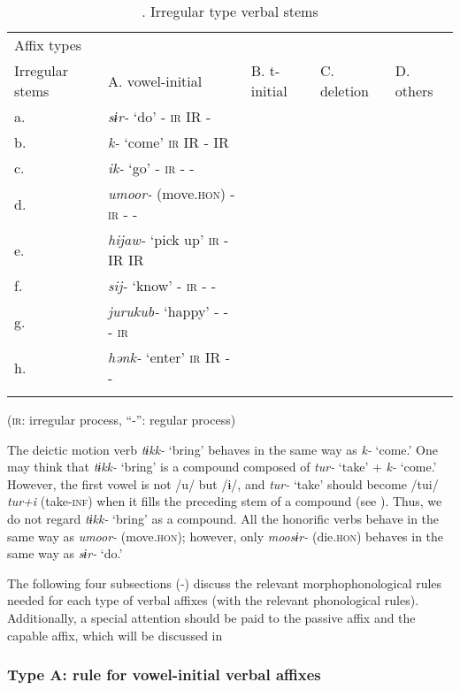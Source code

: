 \begin{table}
\caption{\label{tab:key:59}. Irregular type verbal stems}
\begin{tabular}{lllll}
\lsptoprule
    Affix types\\
Irregular stems &    A. vowel-initial&   B. t-initial &  C. deletion &  D. others\\
\midrule
a.&  \textit{sɨr-} ‘do’    -  \textsc{ir}  IR  -                     \\
b.&  \textit{k-} ‘come’    \textsc{ir}  IR  -  IR                    \\
c.&  \textit{ik-} ‘go’    -  \textsc{ir}  -  -                       \\
d.&  \textit{umoor-} (move.\textsc{hon})    -  \textsc{ir}  -  -     \\
e.&  \textit{hijaw-} ‘pick up’    \textsc{ir}  -  IR  IR             \\
f.&  \textit{sij-} ‘know’    -  \textsc{ir}  -  -                    \\
g.&  \textit{jurukub-} ‘happy’    -  -  -  \textsc{ir}               \\
h.&  \textit{hənk-} ‘enter’    \textsc{ir}  IR  -  -                 \\
\lspbottomrule
\end{tabular}
(\textsc{ir}: irregular process, “-”: regular process)
\end{table}

The deictic motion verb \textit{tɨkk-} ‘bring’ behaves in the same way as \textit{k-} ‘come.’ One may think that \textit{tɨkk-} ‘bring’ is a compound composed of \textit{tur-} ‘take’ + \textit{k-} ‘come.’ However, the first vowel is not /u/ but /ɨ/, and \textit{tur-} ‘take’ should become /tui/ \textit{tur+i} (take-\textsc{inf}) when it fills the preceding stem of a compound (see ). Thus, we do not regard \textit{tɨkk-} ‘bring’ as a compound. All the honorific verbs behave in the same way as \textit{umoor-} (move.\textsc{hon}); however, only \textit{moosɨr-} (die.\textsc{hon}) behaves in the same way as \textit{sɨr-} ‘do.’

The following four subsections (-) discuss the relevant morphophonological rules needed for each type of verbal affixes (with the relevant phonological rules). Additionally, a special attention should be paid to the passive affix and the capable affix, which will be discussed in 

\subsubsection{Type A: rule for vowel-initial verbal affixes}

